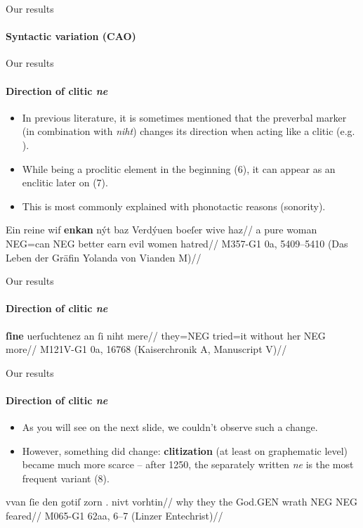 \documentclass[xcolor=table, compress, %
handout
]{beamer}
\begin{document}
\begin{frame}{Our results}
\framesubtitle{Syntactic variation (CAO)}



\end{frame}

\begin{frame}{Our results}
\framesubtitle{Direction of clitic \textit{ne}}

\begin{itemize}
    \item In previous literature, it is sometimes mentioned that the preverbal marker (in combination with \textit{niht}) changes its direction when acting like a clitic (e.g. \citealt{Szczepaniak2010}).
    \item While being a proclitic element in the beginning (6), it can appear as an enclitic later on (7).
    \item This is most commonly explained with phonotactic reasons (sonority).
\end{itemize}

\pex[interpartskip=1ex]
\begingl
\gla Ein reine wif \textbf{enkan} nýt baz Verdýuen boeſer wive haz//
\glb a pure woman {\textsc{NEG}}=can \textsc{NEG} better earn evil women hatred//
\glft M357-G1 0a, 5409–5410 (Das Leben der Gräfin Yolanda von Vianden M)//
\endgl
\xe
\end{frame}

\begin{frame}{Our results}
\framesubtitle{Direction of clitic \textit{ne}}

\pex[interpartskip=1ex]
\begingl
\gla \textbf{ſine} uerſuchtenez an ſi niht mere//
\glb they={\textsc{NEG}} tried=it without her \textsc{NEG} more//
\glft M121V-G1 0a, 16768 (Kaiserchronik A, Manuscript V)//
\endgl
\xe

\end{frame}

\begin{frame}{Our results}
\framesubtitle{Direction of clitic \textit{ne}}

\begin{itemize}
    \item As you will see on the next slide, we couldn't observe such a change.
    \item However, something did change: \textbf{clitization} (at least on graphematic level) became much more scarce – after 1250, the separately written \textit{ne} is the most frequent variant (8).
\end{itemize}

\pex[interpartskip=1ex]
\begingl
\gla vvan ſie den gotiſ zorn . nivt \textbf{} vorhtin//
\glb why they the God.{\textsc{GEN}} wrath {} \textsc{NEG} \textsc{NEG} feared//
\glft M065-G1 62aa, 6–7 (Linzer Entechrist)//
\xe

\end{frame}
\end{document}
